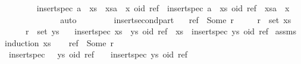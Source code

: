 \begin{isabellebody}
\ \ \ \ \ \ \isamarkupfalse%
\ {\isachardoublequoteopen}insert{\isacharunderscore}spec\ {\isacharparenleft}{\isacharparenleft}a\ {\isacharhash}\ xs{\isacharparenright}\ {\isacharat}\ xsa\ {\isacharat}\ {\isacharbrackleft}x{\isacharbrackright}{\isacharparenright}\ {\isacharparenleft}oid{\isacharcomma}\ ref{\isacharparenright}\ {\isacharequal}\ insert{\isacharunderscore}spec\ {\isacharparenleft}a\ {\isacharhash}\ xs{\isacharparenright}\ {\isacharparenleft}oid{\isacharcomma}\ ref{\isacharparenright}\ {\isacharat}\ xsa\ {\isacharat}\ {\isacharbrackleft}x{\isacharbrackright}{\isachardoublequoteclose}\isanewline
\ \ \ \ \ \ \ \ \isamarkupfalse%
\ {}\ {}\ \isamarkupfalse%
\ auto\isanewline
\ \ \ \ \isamarkupfalse%
\isanewline
\ \ \isamarkupfalse%
\isanewline
{}\isamarkupfalse%
%
\endisatagproof
{\isafoldproof}%
%
\isadelimproof
\isanewline
%
\endisadelimproof
\isanewline
{}\isamarkupfalse%
\ insert{\isacharunderscore}second{\isacharunderscore}part{\isacharcolon}\isanewline
\ \ \ {\isachardoublequoteopen}ref\ {\isacharequal}\ Some\ r{\isachardoublequoteclose}\isanewline
\ \ \ \ \ {\isachardoublequoteopen}r\ {\isasymnotin}\ set\ xs{\isachardoublequoteclose}\isanewline
\ \ \ \ \ {\isachardoublequoteopen}r\ {\isasymin}\ set\ ys{\isachardoublequoteclose}\isanewline
\ \ \ {\isachardoublequoteopen}insert{\isacharunderscore}spec\ {\isacharparenleft}xs\ {\isacharat}\ ys{\isacharparenright}\ {\isacharparenleft}oid{\isacharcomma}\ ref{\isacharparenright}\ {\isacharequal}\ xs\ {\isacharat}\ {\isacharparenleft}insert{\isacharunderscore}spec\ ys\ {\isacharparenleft}oid{\isacharcomma}\ ref{\isacharparenright}{\isacharparenright}{\isachardoublequoteclose}\isanewline
%
\isadelimproof
%
\endisadelimproof
%
\isatagproof
{}\isamarkupfalse%
\ assms\ \isamarkupfalse%
{\isacharparenleft}induction\ xs{\isacharparenright}\isanewline
\ \ \isamarkupfalse%
\ {\isachardoublequoteopen}ref\ {\isacharequal}\ Some\ r{\isachardoublequoteclose}\isanewline
\ \ \isamarkupfalse%
\ {\isachardoublequoteopen}insert{\isacharunderscore}spec\ {\isacharparenleft}{\isacharbrackleft}{\isacharbrackright}\ {\isacharat}\ ys{\isacharparenright}\ {\isacharparenleft}oid{\isacharcomma}\ ref{\isacharparenright}\ {\isacharequal}\ {\isacharbrackleft}{\isacharbrackright}\ {\isacharat}\ insert{\isacharunderscore}spec\ ys\ {\isacharparenleft}oid{\isacharcomma}\ ref{\isacharparenright}{\isachardoublequoteclose}\isanewline

\end{isabellebody}
